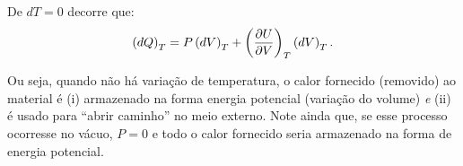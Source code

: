 \documentclass[a4paper,12pt]{scrartcl}
\begin{document}
  De $dT = 0$ decorre que:
  \begin{equation*}
  \left(dQ\right)_T = P\left(dV\right)_T + \left(\frac{\partial U}{\partial V}\right)_{T}\left(dV\right)_T.
  \end{equation*}
  
  Ou seja, quando não há variação de temperatura, o calor fornecido (removido) ao material é (i) armazenado na forma energia potencial (variação do volume) \emph{e} (ii) é usado para ``abrir caminho'' no meio externo. Note ainda que, se esse processo ocorresse no vácuo, $P = 0$ e todo o calor fornecido seria armazenado na forma de energia potencial.
  

  

  
  
  
\end{document}
